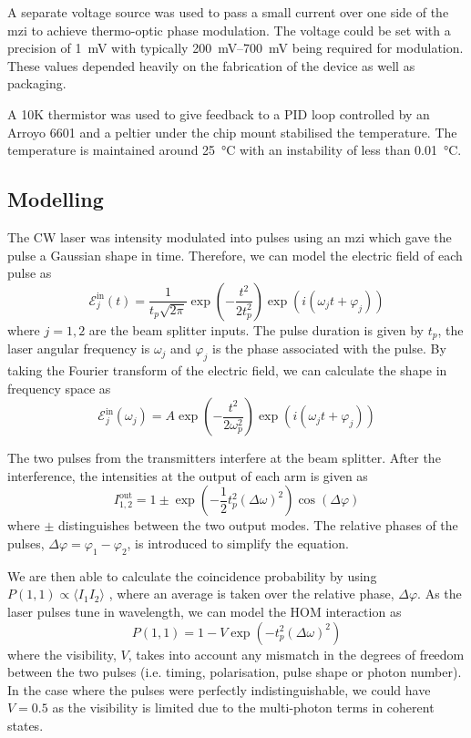 A separate voltage source was used to pass a small current over one side of the \ac{mzi} to achieve thermo-optic phase modulation. The voltage could be set with a precision of \SI{1}{\mV} with typically \SIrange{200}{700}{\mV} being required for modulation. These values depended heavily on the fabrication of the device as well as packaging.

A 10K thermistor was used to give feedback to a PID loop controlled by an Arroyo 6601 and a peltier under the chip mount stabilised the temperature. The temperature is maintained around \SI{25}{\celsius} with an instability of less than \SI{0.01}{\celsius}. 

\subsection{Modelling}

The \ac{CW} laser was intensity modulated into pulses using an \ac{mzi} which gave the pulse a Gaussian shape in time. Therefore, we can model the electric field of each pulse as
\begin{equation}
	\mathcal{E}_j^\text{in}(t) = \frac{1}{t_p\sqrt{2\pi}} \exp{\left(-\frac{t^2}{2 t_p^2}\right)} \exp{\left(i(\omega_j t + \varphi_j)\right)}
\end{equation}
where $j = 1,2$ are the beam splitter inputs. The pulse duration is given by $t_p$, the laser angular frequency is $\omega_j$ and $\varphi_j$ is the phase associated with the pulse. By taking the Fourier transform of the electric field, we can calculate the shape in frequency space as 
\begin{equation}
	\mathcal{E}_j^\text{in}(\omega_j) = A \exp{\left(-\frac{t^2}{2 \omega_p^2}\right)} \exp{\left(i(\omega_j t + \varphi_j)\right)}
\end{equation}

The two pulses from the transmitters interfere at the beam splitter. After the interference, the intensities at the output of each arm is given as
\begin{equation}
	I^\text{out}_{1,2} = 1 \pm \exp{\left(-\frac{1}{2}t_p^2(\Delta\omega)^2\right)}\cos(\Delta\varphi)
\end{equation}
where $\pm$ distinguishes between the two output modes. The relative phases of the pulses, $\Delta\varphi = \varphi_1 - \varphi_2$, is introduced to simplify the equation.

We are then able to calculate the coincidence probability by using $P(1,1) \propto \langle I_1 I_2\rangle$ \cite{Rarity2005}, where an average is taken over the relative phase, $\Delta\varphi$. As the laser pulses tune in wavelength, we can model the \ac{HOM} interaction as 
\begin{equation}
	P(1,1) = 1 - V \exp{\left(-t_p^2(\Delta\omega)^2\right)}
	\label{eq:gaussian}
\end{equation}
where the visibility, $V$, takes into account any mismatch in the degrees of freedom between the two pulses (i.e. timing, polarisation, pulse shape or photon number). In the case where the pulses were perfectly indistinguishable, we could have $V = 0.5$ as the visibility is limited due to the multi-photon terms in coherent states.

